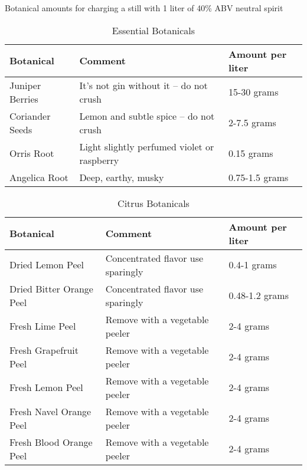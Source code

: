 \documentclass[letterpaper]{recipePMG}
\begin{document}
Botanical amounts for charging a still with 1 liter of 40\% ABV neutral spirit


\begin{table}[H]
    \centering
    \caption{Essential Botanicals}
    \begin{tabular}{@{}p{1.25in}p{3in}p{1.25in}@{}}
        \toprule
      Botanical &  Comment & Amount per liter \\
        \midrule
      	Juniper Berries & It's not gin without it -- do not crush & 15-30 grams  \\
 		Coriander Seeds & Lemon and subtle spice -- do not crush  & 2-7.5 grams \\
		Orris Root & Light slightly perfumed violet or raspberry & 0.15 grams \\
		Angelica Root &  Deep, earthy, musky & 0.75-1.5 grams \\
        \bottomrule
    \end{tabular}
    \label{tab:essential}
\end{table}

\begin{table}[H]
    \centering
    \caption{Citrus Botanicals}
    \begin{tabular}{@{}p{1.25in}p{3in}p{1.25in}@{}}
        \toprule
      Botanical &  Comment & Amount per liter \\
        \midrule
        Dried Lemon Peel & Concentrated flavor use sparingly & 0.4-1 grams\\
        Dried Bitter Orange Peel & Concentrated flavor  use sparingly & 0.48-1.2 grams\\
        Fresh Lime Peel & Remove with a vegetable peeler & 2-4 grams\\
        Fresh Grapefruit Peel & Remove with a vegetable peeler & 2-4 grams\\
        Fresh Lemon Peel & Remove with a vegetable peeler & 2-4 grams\\
        Fresh Navel Orange Peel & Remove with a vegetable peeler & 2-4 grams\\
        Fresh Blood Orange Peel & Remove with a vegetable peeler & 2-4 grams\\
        \bottomrule
    \end{tabular}
    \label{tab:citrus}
\end{table}
\end{document}
